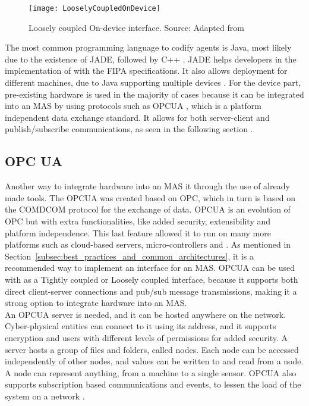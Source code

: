 \begin{figure}[h!]
	\centering
	\texttt{[image: LooselyCoupledOnDevice]}
	\caption{Loosely coupled On-device interface. Source: Adapted from \cite{8591641}}
	\label{fig:loosely_coupled_ondevice}
\end{figure}

The most common programming language to codify agents is Java, most likely due to the existence of  \acrshort{JADE}, followed by C++ \cite{8591641}. \acrshort{JADE} helps developers in the implementation of  with the \acrshort{FIPA} specifications. It also allows deployment for different machines, due to Java supporting multiple devices \cite{JADE_website}.
For the device part, pre-existing hardware is used in the majority of cases because it can be integrated into an \acrshort{MAS} by using protocols such as \acrshort{OPCUA} \cite{8591641}, which is a platform independent data exchange standard. It allows for both server-client and publish/subscribe communications, as seen in the following section \cite{OPCUA_website}.

\subsection{OPC UA}
\label{subsec:opcua}


Another way to integrate hardware into an \acrshort{MAS} it through the use of already made tools. The \acrfull{OPCUA} was created based on \acrfull{OPC}, which in turn is based on the \acrshort{COMDCOM} protocol for the exchange of data. \acrshort{OPCUA} is an evolution of \acrshort{OPC} but with extra functionalities, like added security, extensibility and platform independence. This last feature allowed it to run on many more platforms such as cloud-based servers, micro-controllers and  \cite{OPCUA_website}. As mentioned in Section~\ref{subsec:best_practices_and_common_architectures}, it is a recommended way to implement an interface for an \acrshort{MAS}. \acrshort{OPCUA} can be used with as a Tightly coupled or Loosely coupled interface, because it supports both direct client-server connections and pub/sub message transmissions, making it a strong option to integrate hardware into an \acrshort{MAS}.\\

An \acrshort{OPCUA} server is needed, and it can be hosted anywhere on the network. Cyber-physical entities can connect to it using its address, and it supports encryption and users with different levels of permissions for added security. A server hosts a group of files and folders, called nodes. Each node can be accessed independently of other nodes, and values can be written to and read from a node. A node can represent anything, from a machine to a single sensor. \acrshort{OPCUA} also supports subscription based communications and events, to lessen the load of the system on a network \cite{OPCUA_website}.\\

